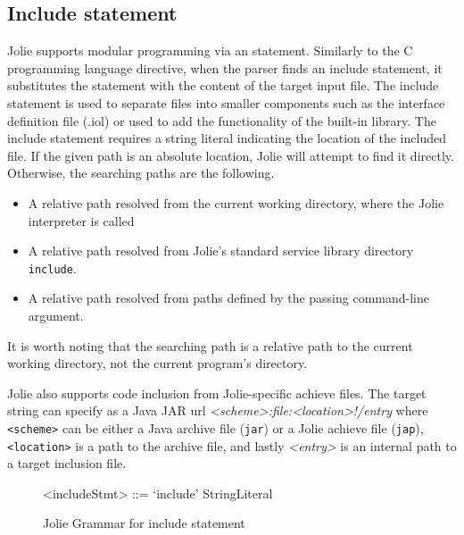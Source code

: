 \subsection{Include statement}
\label{sec:jolie-include}

Jolie supports modular programming via an  statement. Similarly to the C programming language  directive, when the parser finds an include statement, it substitutes the statement with the content of the target input file. The include statement is used to separate files into smaller components such as the interface definition file (.iol) or used to add the functionality of the built-in library. The include statement requires a string literal indicating the location of the included file. If the given path is an absolute location, Jolie will attempt to find it directly. Otherwise, the searching paths are the following.

\begin{itemize}
    \item A relative path resolved from the current working directory, where the Jolie interpreter is called
    \item A relative path resolved from Jolie's standard service library directory \texttt{include}.
    \item A relative path resolved from paths defined by the passing command-line argument.
\end{itemize}

It is worth noting that the searching path is a relative path to the current working directory, not the current program's directory.

Jolie also supports code inclusion from Jolie-specific achieve files.
The target string can specify as a Java JAR url \textit{<scheme>:file:<location>\newline!/{entry}} where \texttt{<scheme>} can be either a Java archive file (\texttt{jar}) or a Jolie achieve file (\texttt{jap}), \texttt{<location>} is a path to the archive file, and lastly \textit{<entry>} is an internal path to a target inclusion file.

\begin{figure}[h]
    \begin{framed}
        \begin{grammar}
            <includeStmt> ::= `include' StringLiteral
        \end{grammar}
    \end{framed}
    \caption{Jolie Grammar for include statement}
    \label{fig:jolie-include}
\end{figure}

